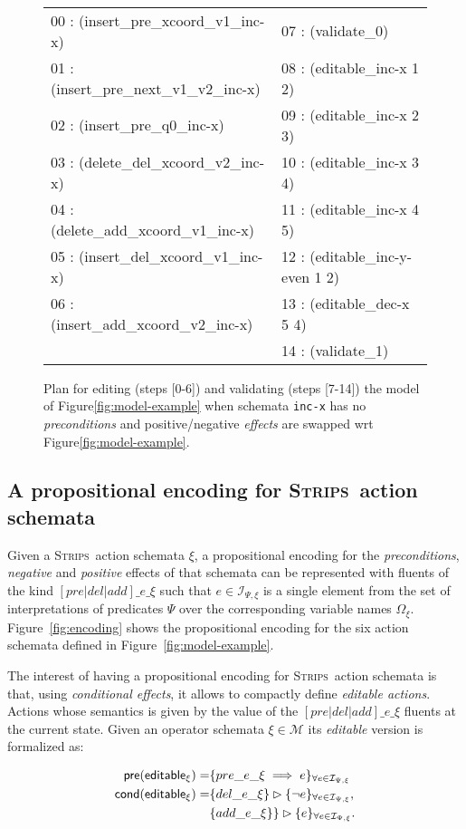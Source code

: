 \documentclass[letterpaper]{article} %
\newcommand{\pre}{\mathsf{pre}}     %
\newcommand{\cond}{\mathsf{cond}}   %
\newcommand{\strips}{\textsc{Strips}}     %
\begin{document}
\begin{figure}
{\tt\tiny
\begin{tabular}{ll}
00 : (insert\_pre\_xcoord\_v1\_inc-x)   & 07 : (validate\_0)\\
01 : (insert\_pre\_next\_v1\_v2\_inc-x) & 08 : (editable\_inc-x 1 2)\\
02 : (insert\_pre\_q0\_inc-x)           & 09 : (editable\_inc-x 2 3)\\
03 : (delete\_del\_xcoord\_v2\_inc-x)   & 10 : (editable\_inc-x 3 4) \\
04 : (delete\_add\_xcoord\_v1\_inc-x)   & 11 : (editable\_inc-x 4 5)\\
05 : (insert\_del\_xcoord\_v1\_inc-x)   & 12 : (editable\_inc-y-even 1 2)\\
06 : (insert\_add\_xcoord\_v2\_inc-x)   & 13 : (editable\_dec-x 5 4)\\
& 14 : (validate\_1)
\end{tabular}
}
 \caption{\small Plan for editing (steps [0-6]) and validating (steps [7-14]) the model of Figure\ref{fig:model-example} when schemata {\tt\small inc-x} has no {\em preconditions} and positive/negative {\em effects} are swapped wrt Figure\ref{fig:model-example}.}
\label{fig:plan-pdistance}
\end{figure}



\subsection{A propositional encoding for \strips\ action schemata}
Given a \strips\ action schemata $\xi$, a propositional encoding for the {\em preconditions}, {\em negative} and {\em positive} effects of that schemata can be represented with fluents of the kind $[pre|del|add]\_e\_\xi$ such that $e\in{\mathcal I}_{\Psi,\xi}$ is a single element from the set of interpretations of predicates $\Psi$ over the corresponding variable names $\Omega_\xi$. Figure~\ref{fig:encoding} shows the propositional encoding for the six action schemata defined in Figure~\ref{fig:model-example}.

The interest of having a propositional encoding for \strips\ action schemata is that, using {\em conditional effects}, it allows to compactly define {\em editable actions}. Actions whose semantics is given by the value of the $[pre|del|add]\_e\_\xi$ fluents at the current state. Given an operator schemata $\xi\in\mathcal{M}$ its {\em editable} version is formalized as:
\begin{small}  
\begin{align*}
\hspace*{7pt}\pre(\mathsf{editable_{\xi}})=&\{pre\_e\_\xi\implies e\}_{\forall e\in{\mathcal I}_{\Psi,\xi}}\\
\cond(\mathsf{editable_{\xi}})=&\{del\_e\_\xi\}\rhd\{\neg e\}_{\forall e\in{\mathcal I}_{\Psi,\xi}},\\
&\{add\_e\_\xi\}\}\rhd\{e\}_{\forall e\in{\mathcal I}_{\Psi,\xi}}.
\end{align*}
\end{small}
\end{document}
